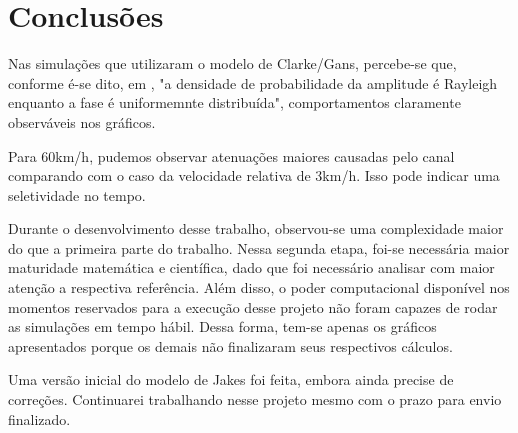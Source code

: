 \documentclass[journal,11pt,twocolumn]{IEEEtran}
\begin{document}
\section{Conclusões}

Nas simulações que utilizaram o modelo de Clarke/Gans, percebe-se que, conforme é-se dito, em \cite{gans}, "a densidade de probabilidade da amplitude é Rayleigh enquanto a fase é uniformemnte distribuída", comportamentos claramente observáveis nos gráficos.

Para 60km/h, pudemos observar atenuações maiores causadas pelo canal comparando com o caso da velocidade relativa de 3km/h. Isso pode indicar  uma seletividade no tempo.

Durante o desenvolvimento desse trabalho, observou-se uma complexidade maior do que a primeira parte do trabalho. Nessa segunda etapa, foi-se necessária maior maturidade matemática e científica, dado que foi necessário analisar com maior atenção a respectiva referência. Além disso, o poder computacional disponível nos momentos reservados para a execução desse projeto não foram capazes de rodar as simulações em tempo hábil. Dessa forma, tem-se apenas os gráficos apresentados porque os demais não finalizaram seus respectivos cálculos.

Uma versão inicial do modelo de Jakes foi feita, embora ainda precise de correções. Continuarei trabalhando nesse projeto mesmo com o prazo para envio finalizado.



\end{document}
